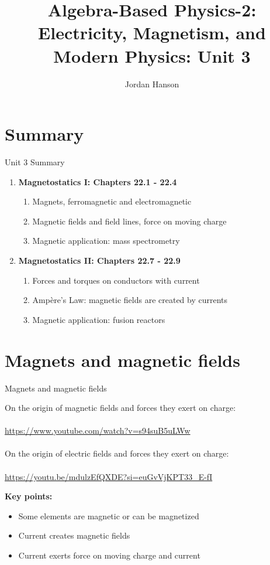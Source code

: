\documentclass{beamer}
\title{Algebra-Based Physics-2: Electricity, Magnetism, and Modern Physics: Unit 3}
\author{Jordan Hanson}
\institute{Whittier College Department of Physics and Astronomy}
\begin{document}
\maketitle

\section{Summary}

\begin{frame}{Unit 3 Summary}
\begin{enumerate}
\item \textbf{Magnetostatics I: Chapters 22.1 - 22.4}
\begin{enumerate}
\item Magnets, ferromagnetic and electromagnetic
\item Magnetic fields and field lines, force on moving charge
\item Magnetic application: \alert{mass spectrometry}
\end{enumerate}
\item \textbf{Magnetostatics II: Chapters 22.7 - 22.9}
\begin{enumerate}
\item Forces and torques on conductors with current
\item Amp\`{e}re's Law: magnetic fields are created by currents
\item Magnetic application: \alert{fusion reactors}
\end{enumerate}
\end{enumerate}
\end{frame}

\section{Magnets and magnetic fields}

\begin{frame}{Magnets and magnetic fields}
\footnotesize
\begin{tcolorbox}[colback=white,colframe=gray,title=Review of the Origin of Electric and Magnetic Fields]
On the origin of magnetic fields and forces they exert on charge:\\ \\
\url{https://www.youtube.com/watch?v=s94suB5uLWw} \\ \\
On the origin of electric fields and forces they exert on charge:\\ \\
\url{https://youtu.be/mdulzEfQXDE?si=euGvVjKPT33_E-fI}
\end{tcolorbox}
\small
\textbf{Key points:}
\begin{itemize}
\item Some elements are magnetic or can be magnetized
\item Current creates magnetic fields
\item Current exerts force on moving charge and current
\end{itemize}
\end{frame}
\end{document}
